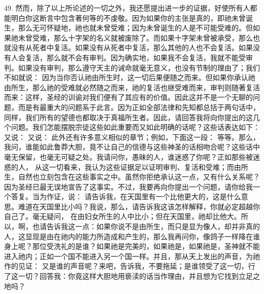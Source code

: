 49. 然而，除了以上所论述的一切之外，我还愿提出进一步的证据，好使所有人都能明白你这断言中包含著何等的不虔敬。因为如果你的主张是真的，即祂未曾诞生，那么无可怀疑地，祂也就未曾受难；因为未曾诞生的人是不可能受难的。但如果祂未曾受难，那么十字架的名义就被废除了。而如果十字架未曾被承受，那么也就没有从死者中复活。如果没有从死者中复活，那么其他的人也不会复活。如果没有人会复活，那么就不会有审判。因为确实地，如果我不会复活，我就不能受审判。如果没有审判，那么遵守天主的诫命就毫无意义，也没有节制的理由了；我们不如就说： 因为当你否认祂由所生时，这一切后果便随之而来。但如果你承认祂由所生，那么祂的受难就必然随之而来，祂的复活也继受难而来，审判则随著复活而来：这样，圣经的训谕对我们便有了其应有的价值。因此这并不是一个无聊的问题，而是有最重大的问题系于此言。因为正如全部法律和先知都总括于两句话中，同样，我们所有的望德也都取决于真福所生者。因此，请回答我将向你提出的这几个问题。我们怎能摆脱宗徒这些如此重要而又如此明确的话呢？这些话表达如下： 又说： 又说： 此外还有许多意义相似的章节；例如，下面这一段： 等等。那么，我问，谁能如此鲁莽大胆，竟不让自己的信德与这些神圣的话相吻合呢？这些话中毫无保留，也毫无可疑之处。我请问你，愚昧的人，谁迷惑了你呢？正如那些被迷惑的人， 从这一切看来，我认为这些证据足以证明审判、复活和受难；而由所生，自然也立刻包含在这些事实之中。虽然你拒绝承认这一点，又有什么关系呢？因为圣经已最无误地宣告了这事实。不过，我要再向你提出一个问题，请你给我一个答复。当为作证，说： 请告诉我，在天国里有一个比他更大的，这是什么意思。难道在天国里比小吗？我说，那么，请告诉我这该怎样解释，你就必定超越你自己了。毫无疑问， 在由妇女所生的人中比小；但在天国里，祂却比他大。所以，啊，也请告诉我这一点：如果你说不是由所生，而只是显为像人，却并非真的人，这显现是由在祂内的能力所造成和产生的，那么我再问你，像鸽子一样降在谁身上呢？那位受洗礼的是谁？如果祂是完美的，如果祂是，如果祂是，圣神就不能进入祂内；正如一个国不能进入另一个国一样。并且，那从天上发出的声音，为祂作的见证： 又是谁的声音呢？来吧，告诉我，不要拖延；是谁领受了这一切，行了这一切？回答我：你竟这样大胆地用亵渎的话当作理由，并且想为它找到立足之地吗？\par

